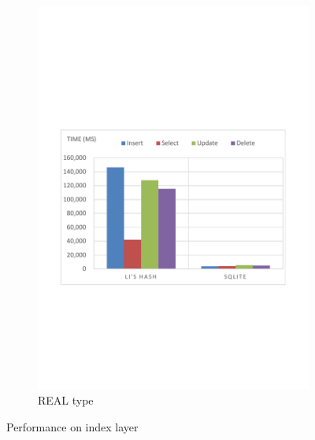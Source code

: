 \begin{figure}
\begin{subfigure}[b]{0.4\textwidth}
                \includegraphics[width=\textwidth]{./performance/result/index-layer/image/100only/real1.pdf}
                \caption{REAL type}
                \label{fig:performance:result:index-layer:insert:string}
        \end{subfigure}

        \caption{Performance on index layer}
        \label{fig:performance:result:index-layer}
\end{figure}

